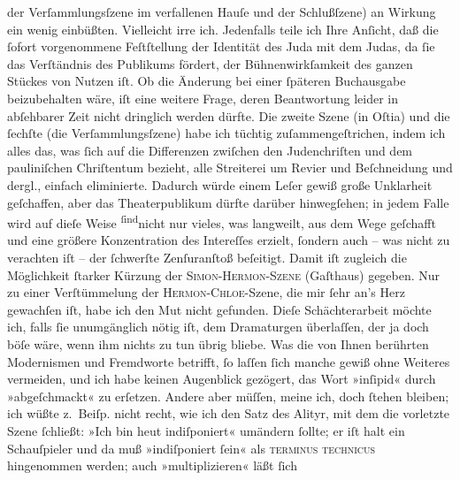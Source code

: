 \begin{ledgroupsized}[t]{13cm}
               der Verſammlungsſzene im verfallenen Hauſe und der Schlußſzene) {\pb}an Wirkung ein wenig einbüßten. Vielleicht
               irre ich. Jedenfalls teile ich Ihre Anſicht, daß die ſofort vorgenommene Feſtſtellung
               der Identität des Juda mit dem Judas, da ſie das Verſtändnis des Publikums fördert,
               der Bühnenwirkſamkeit des ganzen Stückes von Nutzen iſt. Ob die Änderung bei einer
               ſpäteren Buchausgabe beizubehalten wäre, iſt eine weitere Frage, deren Beantwortung
               leider in abſehbarer Zeit nicht dringlich werden dürfte.\pend
           \pstart
           Die zweite Szene (in Oſtia) und die ſechſte (die
               Verſammlungsſzene) habe ich tüchtig zuſammengeſtrichen, indem ich alles das, was ſich
               auf die Differenzen zwiſchen den Judenchriſten und dem pauliniſchen Chriſtentum
               bezieht, alle Streiterei um Revier und Beſchneidung und dergl., einfach eliminierte.
               Dadurch würde einem Leſer gewiß große Unklarheit geſchaffen, aber das Theaterpublikum
               dürfte darüber hinwegſehen; in jedem Falle wird auf dieſe Weise \substVorne{}\textsuperscript{ſind}\substDazwischen{}nicht\substHinten{} nur vieles, was langweilt, aus dem Wege geſchafft und eine größere
               Konzentration des Intereſſes erzielt, ſondern auch – {\pb}was nicht zu verachten iſt – der ſchwerſte
               Zenſuranſtoß beſeitigt. Damit iſt zugleich die Möglichkeit ſtarker Kürzung der \textsc{Simon-Hermon-Szene} (Gaſthaus) gegeben. Nur zu einer
               Verſtümmelung der \textsc{Hermon-Chloe}-Szene, die mir ſehr an’s
               Herz gewachſen iſt, habe ich den Mut nicht gefunden. Dieſe Schächterarbeit möchte
               ich, falls ſie unumgänglich nötig iſt, dem Dramaturgen überlaſſen, der ja doch böſe
               wäre, wenn ihm nichts zu tun übrig bliebe.\pend
           \pstart
           Was die von Ihnen berührten Modernismen und Fremdworte betrifft, ſo laſſen ſich
               manche gewiß ohne Weiteres vermeiden, und ich habe keinen Augenblick gezögert, das
               Wort »inſipid« durch »abgeſchmackt« zu erſetzen. Andere aber müſſen, meine ich, doch
               ſtehen bleiben; ich wüßte z. Beiſp. nicht recht, wie ich den Satz des Alityr, mit dem
               die vorletzte Szene ſchließt: »Ich bin heut indiſponiert« umändern ſollte; er iſt
               halt ein Schauſpieler und da muß »indiſponiert ſein« als \textsc{terminus technicus} hingenommen werden; auch »multiplizieren« läßt ſich

\end{ledgroupsized}

